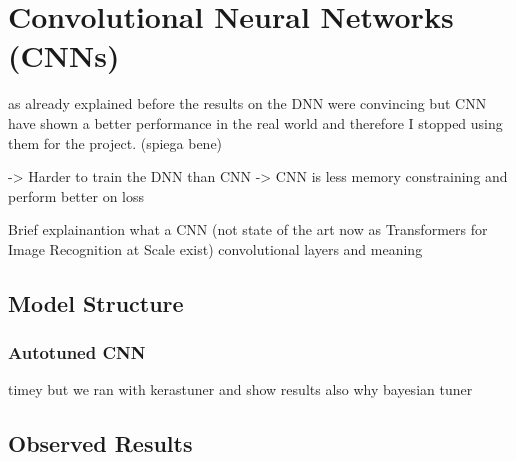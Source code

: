 \newpage
\section{Convolutional Neural Networks (CNNs)}
\label{sec:convolutional-neural-networks-(cnns)}

as already explained before the results on the DNN were convincing but
CNN have shown a better performance in the real world and therefore I stopped
using them for the project. (spiega bene)

-> Harder to train the DNN than CNN
-> CNN is less memory constraining and perform better on  loss


Brief explainantion what a CNN (not state of the art now as Transformers for Image Recognition at Scale exist)
convolutional layers and meaning

\subsection{Model Structure}

\subsubsection{Autotuned CNN}
timey but we ran with kerastuner and show results
also why bayesian tuner

\subsection{Observed Results}

